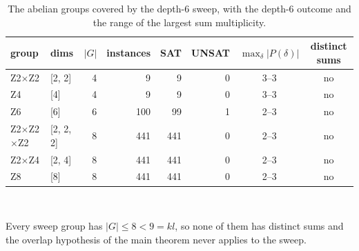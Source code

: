 \begin{table}[tb]
\centering
\small
\caption{The abelian groups covered by the depth-6 sweep, with the depth-6 outcome and the range of the largest sum multiplicity.}
\label{tabS:groups}
\begin{tabular}{llrrrrcc}
\toprule
group & dims & $|G|$ & instances & SAT & UNSAT & $\max_\delta|P(\delta)|$ & distinct sums \\
\midrule
Z2$\times$Z2 & [2, 2] & 4 & 9 & 9 & 0 & 3--3 & no \\
Z4 & [4] & 4 & 9 & 9 & 0 & 3--3 & no \\
Z6 & [6] & 6 & 100 & 99 & 1 & 2--3 & no \\
Z2$\times$Z2$\times$Z2 & [2, 2, 2] & 8 & 441 & 441 & 0 & 2--3 & no \\
Z2$\times$Z4 & [2, 4] & 8 & 441 & 441 & 0 & 2--3 & no \\
Z8 & [8] & 8 & 441 & 441 & 0 & 2--3 & no \\
\bottomrule
\end{tabular}
\\[2pt]\begin{minipage}{\linewidth}\footnotesize Every sweep group has $|G| \leq 8 < 9 = kl$, so none of them has distinct sums and the overlap hypothesis of the main theorem never applies to the sweep.\end{minipage}
\end{table}
